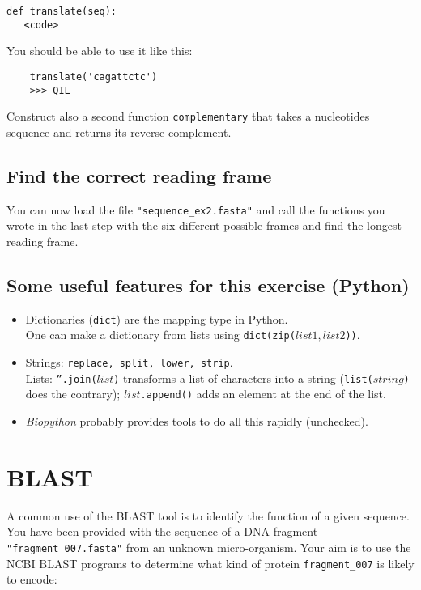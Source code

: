 \documentclass[a4paper,11pt]{article}
\begin{document}
\begin{verbatim}
def translate(seq): 
   <code>
\end{verbatim}

You should be able to use it like this:
\begin{verbatim}
	translate('cagattctc')
	>>> QIL
\end{verbatim}

Construct also a second function \texttt{complementary} that takes a nucleotides sequence and returns its reverse complement.

\subsection{Find the correct reading frame}
You can now load the file \texttt{"sequence\_ex2.fasta"} and call the functions you wrote in the last step with the six different possible frames and find the longest reading frame.

\subsection{Some useful features for this exercise (Python)}
\begin{itemize}
\item Dictionaries (\texttt{dict}) are the mapping type in Python. \\
	  One can make a dictionary from lists using \texttt{dict(zip(}$list1,list2$\texttt{))}.
\item Strings: \texttt{replace, split, lower, strip}. \\
	  Lists: \texttt{''.join(}$list$\texttt{)} transforms a list of characters into a string (\texttt{list(}$string$\texttt{)} does the contrary); $list$\texttt{.append()} adds an element at the end of the list.
\item \textit{Biopython} probably provides tools to do all this rapidly (unchecked).
\end{itemize}


\section{BLAST}
A common use of the BLAST tool is to identify the function of a given sequence. You have been provided with the sequence of a DNA fragment \texttt{"fragment\_007.fasta"} from an unknown micro-organism. Your aim is to use the NCBI BLAST programs to determine what kind of protein \texttt{fragment\_007} is likely to encode:\\
\end{document}
